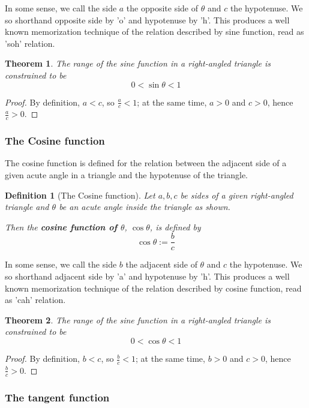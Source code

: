 \documentclass[12pt]{article}
\newtheorem{definition}{Definition}[section]
\newtheorem*{theorem}{Theorem}
\begin{document}
    In some sense, we call the side $a$ the opposite side of $\theta$ and $c$ the hypotenuse. We so shorthand opposite side by 'o' and hypotenuse by 'h'. This produces a well known memorization technique of the relation described by sine function, read as 'soh' relation.

    \begin{theorem}
        The range of the sine function in a right-angled triangle is constrained to be $$0<\sin{\theta}<1$$
    \end{theorem}

    \begin{proof}
        By definition, $a<c$, so $\frac{a}{c}<1$; at the same time, $a>0$ and $c>0$, hence $\frac{a}{c}>0$.
    \end{proof}

    \subsubsection{The Cosine function}

    The cosine function is defined for the relation between the adjacent side of a given acute angle in a triangle and the hypotenuse of the triangle.

    \begin{definition}[The Cosine function]
        Let $a,b,c$ be sides of a given right-angled triangle and $\theta$ be an acute angle inside the triangle as shown.

        Then the \textbf{cosine function of $\theta$}, $\cos{\theta}$, is defined by $$\cos{\theta}:=\frac{b}{c}$$
    \end{definition}

    In some sense, we call the side $b$ the adjacent side of $\theta$ and $c$ the hypotenuse. We so shorthand adjacent side by 'a' and hypotenuse by 'h'. This produces a well known memorization technique of the relation described by cosine function, read as 'cah' relation.

    \begin{theorem}
        The range of the sine function in a right-angled triangle is constrained to be $$0<\cos{\theta}<1$$
    \end{theorem}

    \begin{proof}
        By definition, $b<c$, so $\frac{b}{c}<1$; at the same time, $b>0$ and $c>0$, hence $\frac{b}{c}>0$.
    \end{proof}

    \subsubsection{The tangent function}
\end{document}
